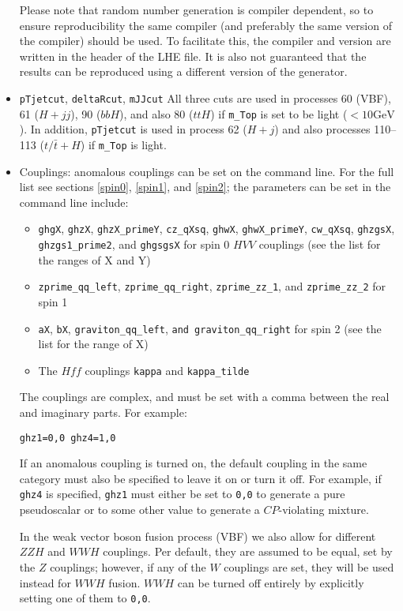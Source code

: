 \documentclass[aps,superscriptaddress,nofootinbib]{revtex4}
\begin{document}
\begin{itemize}
Please note that random number generation is compiler dependent, so to ensure reproducibility the same compiler (and preferably the same version of the compiler) should be used.  To facilitate this, the compiler and version are written in the header of the LHE file.  It is also not guaranteed that the results can be reproduced using a different version of the generator.

\item \verb|pTjetcut|, \verb|deltaRcut|, \verb|mJJcut| All three cuts are used in processes 60 (VBF), 61 ($H+jj$), 90 ($bbH$), and also 80 ($ttH$) if \verb|m_Top| is set to be light ($<10 \text{GeV}$).  In addition, \verb|pTjetcut| is used in process 62 ($H+j$) and also processes 110--113 ($t/\bar{t}+H$) if \verb|m_Top| is light.
\item Couplings: anomalous couplings can be set on the command line.  For the full list see sections \ref{spin0}, \ref{spin1}, and \ref{spin2}; the parameters can be set in the command line include:
\begin{itemize}
\item \verb|ghgX|, \verb|ghzX|, \verb|ghzX_primeY|, \verb|cz_qXsq|, \verb|ghwX|, \verb|ghwX_primeY|, \verb|cw_qXsq|, \verb|ghzgsX|, \verb|ghzgs1_prime2|, and \verb|ghgsgsX| for spin 0 $HVV$ couplings (see the list for the ranges of X and Y)
\item \verb|zprime_qq_left|, \verb|zprime_qq_right|, \verb|zprime_zz_1|, and \verb|zprime_zz_2| for spin 1
\item \verb|aX|, \verb|bX|, \verb|graviton_qq_left|, \verb|and graviton_qq_right| for spin 2 (see the list for the range of X)
\item The $Hff$ couplings \verb|kappa| and \verb|kappa_tilde|
\end{itemize}
The couplings are complex, and must be set with a comma between the real and imaginary parts.  For example:
\begin{verbatim}
ghz1=0,0 ghz4=1,0
\end{verbatim}
If an anomalous coupling is turned on, the default coupling in the same category must also be specified to leave it on or turn it off.  For example, if \verb|ghz4| is specified, \verb|ghz1| must either be set to \verb|0,0| to generate a pure pseudoscalar or to some other value to generate a $CP$-violating mixture.

In the weak vector boson fusion process (VBF) we also allow for different $ZZH$ and $WWH$ couplings.  Per default, they are assumed to be equal, set by the $Z$ couplings; however, if any of the $W$ couplings are set, they will be used instead for $WWH$ fusion.  $WWH$ can be turned off entirely by explicitly setting one of them to \verb|0,0|.


\end{itemize}
\end{document}

